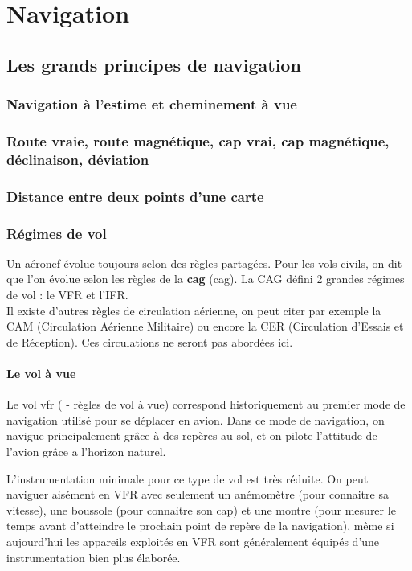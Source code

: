 \section{Navigation}
	\subsection{Les grands principes de navigation}
		\subsubsection{Navigation à l'estime et cheminement à vue}
		\subsubsection{Route vraie, route magnétique, cap vrai, cap magnétique, déclinaison, déviation}
		\subsubsection{Distance entre deux points d'une carte}
		\subsubsection{Régimes de vol}
		Un aéronef évolue toujours selon des règles partagées. Pour les vols civils, on dit que l'on évolue selon les règles de la \textbf{\acrlong{cag}}	(\acrshort{cag}). La CAG défini 2 grandes régimes de vol : le VFR et l'IFR.\\
		
		Il existe d'autres règles de circulation aérienne, on peut citer par exemple la CAM (Circulation Aérienne Militaire) ou encore la CER (Circulation d'Essais et de Réception). Ces circulations ne seront pas abordées ici.
		
		\paragraph{Le vol à vue}
		Le vol \acrshort{vfr} ( - règles de vol à vue) correspond historiquement au premier mode de navigation utilisé pour se déplacer en avion. Dans ce mode de navigation, on navigue principalement grâce à des repères au sol, et on pilote l'attitude de l'avion grâce a l'horizon naturel. 
		
		L'instrumentation minimale pour ce type de vol est très réduite. On peut naviguer aisément en VFR avec seulement un anémomètre (pour connaitre sa vitesse), une boussole (pour connaitre son cap) et une montre (pour mesurer le temps avant d'atteindre le prochain point de repère de la navigation), même si aujourd'hui les appareils exploités en VFR sont généralement équipés d'une instrumentation bien plus élaborée.
		
